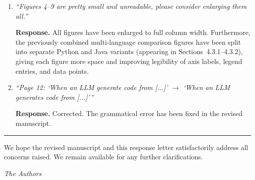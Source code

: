 \documentclass[12pt]{article}
\begin{document}
\begin{enumerate}[leftmargin=*, label=\textbf{R3.\arabic*.}]
\textbf{Response.}
We have updated the manuscript to use the \texttt{sn-mathphys-ay} document class,
which enforces the author-year citation style required by AUSE. All in-text
citations now follow the author-year convention and the reference list is formatted
accordingly.

\item \textit{``Figures 4--9 are pretty small and unreadable, please consider enlarging
them all.''}

\textbf{Response.}
All figures have been enlarged to full column width. Furthermore, the previously
combined multi-language comparison figures have been split into separate Python and
Java variants (appearing in Sections~4.3.1--4.3.2), giving each figure more space
and improving legibility of axis labels, legend entries, and data points.

\item \textit{``Page 12: `When an LLM generate code from [...]' $\rightarrow$
`When an LLM generates code from [...]'''}

\textbf{Response.}
Corrected. The grammatical error has been fixed in the revised manuscript.

\end{enumerate}

\bigskip\hrule\bigskip

\noindent We hope the revised manuscript and this response letter satisfactorily
address all concerns raised. We remain available for any further clarifications.

\bigskip
\noindent\textit{The Authors}
\end{document}
